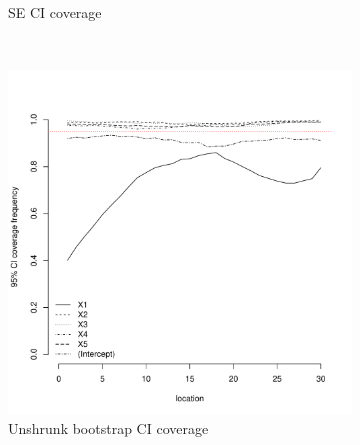 \documentclass[authoryear, review, 11pt]{elsarticle}
\begin{document}
\begin{figure}
\begin{subfigure}[b]{0.45\textwidth}
		\caption{SE CI coverage}
	\end{subfigure}%
	\\%
	\begin{subfigure}[b]{0.45\textwidth}
	\centering
		\includegraphics[width=\textwidth]{../../figures/simulation/15.20.profile_unshrunk_bootstrap_coverage.pdf}
		\caption{Unshrunk bootstrap CI coverage}
	\end{subfigure}%
	~ %
	\begin{subfigure}[b]{0.45\textwidth}
	\centering

\end{subfigure}
\end{figure}
\end{document}
